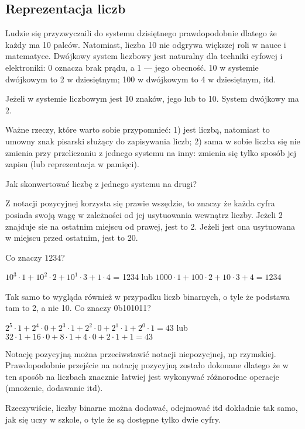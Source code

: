 \subsection{Reprezentacja liczb}

Ludzie się przyzwyczaili do systemu dzisiętnego prawdopodobnie dlatego że każdy ma 10 palców.
Natomiast, liczba 10 nie odgrywa większej roli w nauce i matematyce.
Dwójkowy system liczbowy jest naturalny dla techniki cyfowej i elektroniki: 0 oznacza brak prądu, a 1 --- jego obecność.
10 w systemie dwójkowym to 2 w dziesiętnym; 100 w dwójkowym to 4 w dziesiętnym, itd.

Jeżeli w systemie liczbowym jest 10 znaków, jego  lub  to 10.
System dwójkowy ma  2.

Ważne rzeczy, które warto sobie przypomnieć:
1)  jest liczbą, natomiast  to umowny znak pisarski służący do zapisywania liczb;
2) sama w sobie liczba się nie zmienia przy przeliczaniu z jednego systemu na inny: zmienia się tylko sposób jej zapisu (lub reprezentacja w pamięci).

Jak skonwertować liczbę z jednego systemu na drugi?

Z notacji pozycyjnej korzysta się prawie wszędzie, to znaczy że każda cyfra posiada swoją wagę w zależności od jej usytuowania wewnątrz liczby.
Jeżeli 2 znajduje sie na ostatnim miejscu od prawej, jest to 2.
Jeżeli jest ona usytuowana w miejscu przed ostatnim, jest to 20.

Co znaczy $1234$?

$10^3 \cdot 1 + 10^2 \cdot 2 + 10^1 \cdot 3 + 1 \cdot 4$ = 1234 lub
$1000 \cdot 1 + 100 \cdot 2 + 10 \cdot 3 + 4 = 1234$

Tak samo to wygląda również w przypadku liczb binarnych, o tyle że podstawa tam to 2, a nie 10.
Co znaczy 0b101011?

$2^5 \cdot 1 + 2^4 \cdot 0 + 2^3 \cdot 1 + 2^2 \cdot 0 + 2^1 \cdot 1 + 2^0 \cdot 1 = 43$ lub
$32 \cdot 1 + 16 \cdot 0 + 8 \cdot 1 + 4 \cdot 0 + 2 \cdot 1 + 1 = 43$

Notację pozycyjną można przeciwstawić notacji niepozycjnej, np rzymskiej.
Prawdopodobnie przejście na notację pozycyjną zostało dokonane dlatego że w ten sposób na liczbach znacznie łatwiej jest wykonywać różnorodne operacje (mnożenie, dodawanie itd).

Rzeczywiście, liczby binarne można dodawać, odejmować itd dokładnie tak samo, jak się uczy w szkole, o tyle że są dostępne tylko dwie cyfry.

